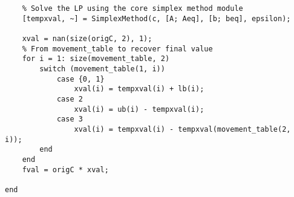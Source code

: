 \documentclass[bwprint, withouttitlepage]{mathexpthesis}
\begin{document}
\begin{verbatim}
    % Solve the LP using the core simplex method module
    [tempxval, ~] = SimplexMethod(c, [A; Aeq], [b; beq], epsilon);

    xval = nan(size(origC, 2), 1);
    % From movement_table to recover final value
    for i = 1: size(movement_table, 2)
        switch (movement_table(1, i))
            case {0, 1}
                xval(i) = tempxval(i) + lb(i);
            case 2
                xval(i) = ub(i) - tempxval(i);
            case 3
                xval(i) = tempxval(i) - tempxval(movement_table(2, i));
        end
    end
    fval = origC * xval;
    
end
    
\end{verbatim}
\end{document}
